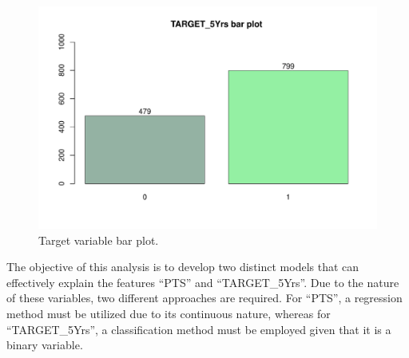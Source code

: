 \begin{figure}[H]
	\centering
	\includegraphics[width=0.5\linewidth]{ImageFiles/Histograms/bp_target5yrs.pdf}
	\caption{Target variable bar plot.}
	\label{fig:target_bar_plot}
\end{figure}

The objective of this analysis is to develop two distinct models that can effectively explain the features ``PTS'' and ``TARGET\_5Yrs''. Due to the nature of these variables, two different approaches are required. For ``PTS'', a regression method must be utilized due to its continuous nature, whereas for ``TARGET\_5Yrs'', a classification method must be employed given that it is a binary variable.